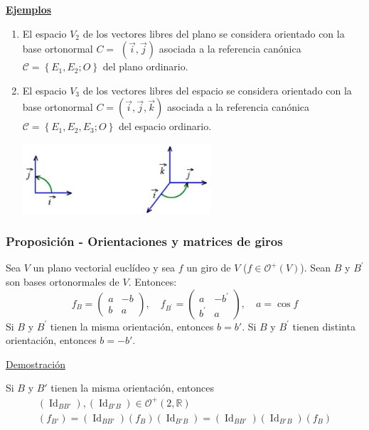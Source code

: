 \documentclass[12pt, a4paper, ones, notitlepage, openany,titlepage]{article}
\newcommand{\demostracion}{\noindent\underline{Demostración}}
\newcommand{\ejemplos}{\noindent\underline{\textbf{Ejemplos}}}
\begin{document}
\ejemplos
\begin{enumerate}[label=(\arabic*)]
	\item El espacio $V_{2}$ de los vectores libres del plano se considera orientado con la base ortonormal $C=$ $(\overrightarrow{i}, \overrightarrow{j})$ asociada a la referencia canónica $\mathcal{C}=\left\{E_{1}, E_{2} ; O\right\}$ del plano ordinario.
	
	\item El espacio $V_{3}$ de los vectores libres del espacio se considera orientado con la base ortonormal $C=(\overrightarrow{i}, \overrightarrow{j}, \overrightarrow{k})$ asociada a la referencia canónica $\mathcal{C}=\left\{E_{1}, E_{2}, E_{3} ; O\right\}$ del espacio ordinario.
	
	\includegraphics[max width=7cm, center]{2023_03_20_c2fe6c117849a1a0e8afg-057}
\end{enumerate}

\subsubsection{Proposición - Orientaciones y matrices de giros}
Sea $V$ un plano vectorial euclídeo y sea $f$ un giro de $V$ ($f \in \mathcal{O}^+(V)$). Sean $B$ y $B^{\prime}$ son bases ortonormales de $V$. Entonces:
$$
f_{B}=\left(\begin{array}{rr}
	a & -b \\
	b & a
\end{array}\right), \quad f_{B^{\prime}}=\left(\begin{array}{rr}
	a & -b^{\prime} \\
	b^{\prime} & a
\end{array}\right), \quad a = \operatorname{cos}f
$$
Si $B$ y $B^{\prime}$ tienen la misma orientación, entonces $b = b'$. Si $B$ y $B^{\prime}$ tienen distinta orientación, entonces $b = -b'$.

\demostracion

Si $B$ y $B'$ tienen la misma orientación, entonces
\begin{gather*}
	(\operatorname{Id}_{BB'}),(\operatorname{Id}_{B'B}) \in \mathcal{O}^+(2,\mathbb{R}) \\
	(f_{B'}) = (\operatorname{Id}_{BB'})(f_{B})(\operatorname{Id}_{B'B})
	= (\operatorname{Id}_{BB'})(\operatorname{Id}_{B'B})(f_B)
\end{gather*}
\end{document}

